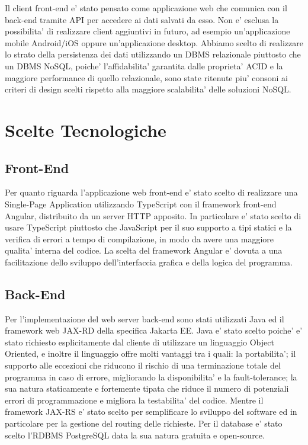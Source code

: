 \newline
Il client front-end e' stato pensato come applicazione web che comunica con il back-end tramite API per accedere ai dati salvati da esso. Non e' esclusa la possibilita' di realizzare client aggiuntivi in futuro, ad esempio un'applicazione mobile Android/iOS oppure un'applicazione desktop.
\newline
Abbiamo scelto di realizzare lo strato della persistenza dei dati utilizzando un DBMS relazionale piuttosto che un DBMS NoSQL, poiche' l'affidabilita' garantita dalle proprieta' ACID e la maggiore performance di quello relazionale, sono state ritenute piu' consoni ai criteri di design scelti rispetto alla maggiore scalabilita' delle soluzioni NoSQL.


\section{Scelte Tecnologiche}
\subsection{Front-End}
Per quanto riguarda l'applicazione web front-end e' stato scelto di realizzare una Single-Page Application utilizzando TypeScript con il framework front-end Angular, distribuito da un server HTTP apposito. 
In particolare e' stato scelto di usare TypeScript piuttosto che JavaScript per il suo supporto a tipi statici e la verifica di errori a tempo di compilazione, in modo da avere una maggiore qualita' interna del codice. 
La scelta del framework Angular e' dovuta a una facilitazione dello sviluppo dell'interfaccia grafica e della logica del programma.
\subsection{Back-End}
Per l'implementazione del web server back-end sono stati utilizzati Java ed il framework web JAX-RD della specifica Jakarta EE. Java e' stato scelto poiche' e' stato richiesto esplicitamente dal cliente di utilizzare un linguaggio Object Oriented, e inoltre il linguaggio offre molti vantaggi tra i quali: la portabilita'; il supporto alle eccezioni che riducono il rischio di una terminazione totale del programma in caso di errore, migliorando la disponibilita' e la fault-tolerance; la sua natura staticamente e fortemente tipata che riduce il numero di potenziali errori di programmazione e migliora la testabilita' del codice. Mentre il framework JAX-RS e' stato scelto per semplificare lo sviluppo del software ed in particolare per la gestione del routing delle richieste. Per il database e' stato scelto l'RDBMS PostgreSQL data la sua natura gratuita e open-source. 
